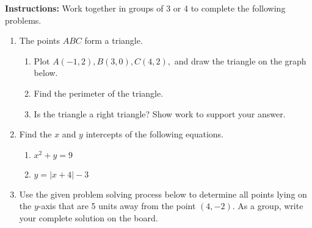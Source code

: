  



\noindent \textbf{Instructions:}  Work together in groups of  3 or 4 to complete the following problems.


\begin{enumerate}
\item The points $ABC$ form a triangle.
\begin{enumerate}
\item Plot $A(-1,2),B(3,0) , C(4,2), $ and draw the triangle on the graph below.\\


\item Find the perimeter of the triangle.\vfill
\item Is the triangle a right triangle?  Show work to support your answer.\\[1in]
\end{enumerate}


\newpage


\item Find the $x$ and $y$ intercepts of the following equations.
\begin{enumerate}
\item $x^2+y=9$
\vfill
\item $y=|x+4|-3$
\end{enumerate}
\vfill

\newpage

\item Use the given problem solving process below to determine all points lying on the $y$-axis that are 5 units away from the point $(4,-2)$.  As a group, write your complete solution on the board. 



\end{enumerate}
